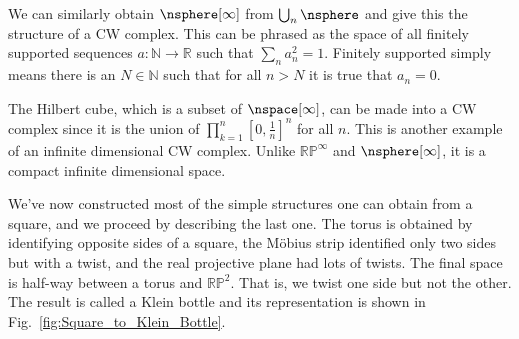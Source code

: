\documentclass{book}                                                           %
\begin{document}
            \begin{example}
                We can similarly obtain $\nsphere[\infty]$ from
                $\bigcup_{n}\nsphere$ and give this the structure of a CW
                complex. This can be phrased as the space of all finitely
                supported sequences $a:\mathbb{N}\rightarrow\mathbb{R}$ such
                that $\sum_{n}a_{n}^{2}=1$. Finitely supported simply means
                there is an $N\in\mathbb{N}$ such that for all $n>N$ it is
                true that $a_{n}=0$.
            \end{example}
            \begin{example}
                The Hilbert cube, which is a subset of $\nspace[\infty]$, can
                be made into a CW complex since it is the union of
                $\prod_{k=1}^{n}[0,\frac{1}{n}]^{n}$ for all $n$. This is
                another example of an infinite dimensional CW complex. Unlike
                $\mathbb{RP}^{\infty}$ and $\nsphere[\infty]$, it is a compact
                infinite dimensional space.
            \end{example}
            \par
            \hfill
            \begin{minipage}[t]{0.54\textwidth}
                We've now constructed most of the simple structures one can
                obtain from a square, and we proceed by describing the last one.
                The torus is obtained by identifying opposite sides of a square,
                the M\"{o}bius strip identified only two sides but with
                a twist, and the real projective plane had lots of twists. The
                final space is half-way between a torus and $\mathbb{RP}^{2}$.
                That is, we twist one side but not the other. The result is
                called a Klein bottle and its representation is shown in
                Fig.~\ref{fig:Square_to_Klein_Bottle}.
            \end{minipage}
\end{document}
